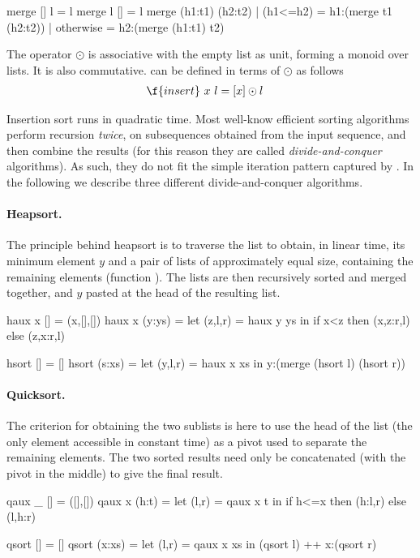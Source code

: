 \documentclass[a4paper,11pt]{llncs}
\begin{document}
\begin{code}
merge [] l = l
merge l [] = l
merge (h1:t1) (h2:t2) 
      | (h1<=h2)  = h1:(merge t1 (h2:t2))
      | otherwise = h2:(merge (h1:t1) t2)
\end{code}
The operator $\odot$ is associative with the empty list as unit,
forming a monoid over lists.  It is also commutative.  can
be defined in terms of $\odot$ as follows
\begin{align}
\label{eq:inswrap1}  \f{insert}\ x\ l & = [x] \odot l
\end{align}

Insertion sort runs in quadratic time.  Most well-know efficient
sorting algorithms perform recursion \emph{twice}, on subsequences
obtained from the input sequence, and then combine the results (for
this reason they are called \emph{divide-and-conquer} algorithms). As
such, they do not fit the simple iteration pattern captured by
.
In the following we describe three different divide-and-conquer
algorithms.  

\paragraph{Heapsort.} The principle behind heapsort is to traverse the
list to obtain, in linear time, its minimum element $y$ and a pair of
lists of approximately equal size, containing the remaining elements
(function ). The lists are then recursively sorted and merged
together, and $y$ pasted at the head of the resulting list.
\begin{code}
haux x [] = (x,[],[])
haux x (y:ys) = let (z,l,r) = haux y ys
                in if x<z then (x,z:r,l) else (z,x:r,l)

hsort []     = []
hsort (s:xs) = let (y,l,r) = haux x xs
               in y:(merge (hsort l) (hsort r))
\end{code}


\paragraph{Quicksort.} The criterion for obtaining the two sublists is
here to use the head of the list (the only element accessible in
constant time) as a pivot used to separate the remaining elements. The
two sorted results need only be concatenated (with the pivot in the
middle) to give the final result. 

\begin{code}
qaux _ []    = ([],[])
qaux x (h:t) = let (l,r) = qaux x t
               in if h<=x then (h:l,r) else (l,h:r)

qsort []     = []
qsort (x:xs) = let (l,r) = qaux x xs 
               in (qsort l) ++ x:(qsort r)
\end{code}
\end{document}

